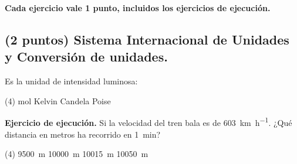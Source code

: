 \documentclass[12pt, letter]{exam}
\begin{document}


\setcounter{page}{3}

\begin{center}
\textbf{Cada ejercicio vale 1 punto, incluidos los ejercicios de ejecución.}
\end{center}

\begin{questions}
    
    \section{(2 puntos) Sistema Internacional de Unidades y Conversión de unidades.}
    
    \question Es la unidad de intensidad luminosa:
    \begin{tasks}(4)
    \task mol
    \task Kelvin
    \task Candela
    \task Poise
    \end{tasks}


    \question \label{Ejercicio_01} \textbf{Ejercicio de ejecución.} Si la velocidad del tren bala es de \SI{603}{\kilo\meter\per\hour}. ¿Qué distancia en metros ha recorrido en \SI{1}{\minute}?
    \begin{tasks}(4)
        \task \SI{9500}{\meter}
        \task \SI{10000}{\meter}
        \task \SI{10015}{\meter}
        \task \SI{10050}{\meter}
        

\end{tasks}
\end{questions}
\end{document}
